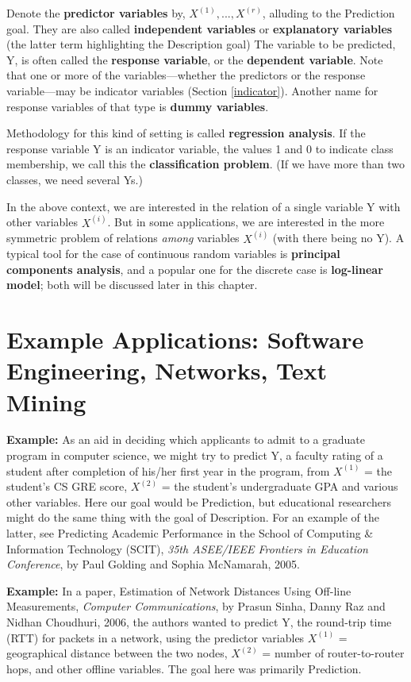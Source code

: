 Denote the {\bf predictor variables} by, $X^{(1)},...,X^{(r)}$, alluding
to the Prediction goal.  They are also called {\bf independent
variables} or {\bf explanatory variables} (the latter term highlighting
the Description goal) The variable to be predicted, Y, is often called
the {\bf response variable}, or the {\bf dependent variable}.  Note that
one or more of the variables---whether the predictors or the response
variable---may be indicator variables (Section \ref{indicator}).
Another name for response variables of that type is {\bf dummy
variables}.  

Methodology for this kind of setting is called {\bf regression
analysis}.  If the response variable Y is an indicator variable, the
values 1 and 0 to indicate class membership, we call this the {\bf
classification problem}.  (If we have more than two classes, we need
several Ys.)

In the above context, we are interested in the relation of a single
variable Y with other variables $X^{(i)}$.  But in some applications, we
are interested in the more symmetric problem of relations {\it among}
variables $X^{(i)}$ (with there being no Y).  A typical tool for the
case of continuous random variables is {\bf principal components
analysis}, and a popular one for the discrete case is {\bf log-linear
model}; both will be discussed later in this chapter.

\section{Example Applications:  Software Engineering, Networks, Text
Mining}
\label{examples}

{\bf Example:}  As an aid in deciding which applicants to admit to a
graduate program in computer science, we might try to predict Y, a
faculty rating of a student after completion of his/her first year in
the program, from $X^{(1)}$ = the student's CS GRE score, $X^{(2)}$ = the
student's undergraduate GPA and various other variables.  Here our goal
would be Prediction, but educational researchers might do the same thing
with the goal of Description.  For an example of the latter, see
Predicting Academic Performance in the School of Computing \& Information
Technology (SCIT), {\it 35th ASEE/IEEE Frontiers in Education
Conference}, by Paul Golding and Sophia McNamarah, 2005.

{\bf Example:}  In a paper, Estimation of Network Distances Using
Off-line Measurements, {\it Computer Communications}, by Prasun Sinha,
Danny Raz and Nidhan Choudhuri, 2006, the authors wanted to predict Y,
the round-trip time (RTT) for packets in a network, using the predictor
variables $X^{(1)}$ = geographical distance between the two nodes,
$X^{(2)}$ = number of router-to-router hops, and other offline
variables.  The goal here was primarily Prediction.

